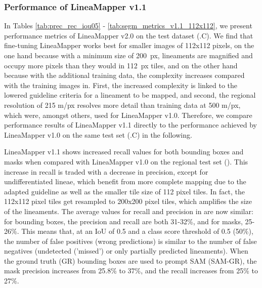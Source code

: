 \subsubsection{Performance of LineaMapper v1.1}\label{sec:LM1.1}
In Tables \ref{tab:prec_rec_iou05} - \ref{tab:segm_metrics_v1.1_112x112}, we present performance metrics of LineaMapper v2.0 on the test dataset (.C).
We find that fine-tuning LineaMapper works best for smaller images of 112x112 pixels, on the one hand because with a minimum size of 200~px, lineaments are magnified and occupy more pixels than they would in 112~px tiles, and on the other hand because with the additional training data, the complexity increases compared with the training images in. First, the increased complexity is linked to the lowered guideline criteria for a lineament to be mapped, and second, the regional resolution of 215 m/px resolves more detail than training data at 500 m/px, which were, amongst others, used for LineaMapper v1.0. Therefore, we compare performance results of LineaMapper v1.1 directly to the performance achieved by LineaMapper v1.0 on the same test set (.C) in the following. 

LineaMapper v1.1 shows increased recall values for both bounding boxes and masks when compared with LineaMapper v1.0 on the regional test set (). This increase in recall is traded with a decrease in precision, except for undifferentiated lineae, which benefit from more complete mapping due to the adapted guideline as well as the smaller tile size of 112 pixel tiles. In fact, the 112x112 pixel tiles get resampled to 200x200 pixel tiles, which amplifies the size of the lineaments. The average values for recall and precision in  are now similar: for bounding boxes, the precision and recall are both 31-32\%, and for masks, 25-26\%. This means that, at an IoU of 0.5 and a class score threshold of 0.5 (50\%), the number of false positives (wrong predictions) is similar to the number of false negatives (undetected ('missed') or only partially predicted lineaments). When the ground truth (GR) bounding boxes are used to prompt SAM (SAM-GR), the mask precision increases from 25.8\% to 37\%, and the recall increases from 25\% to 27\%.


